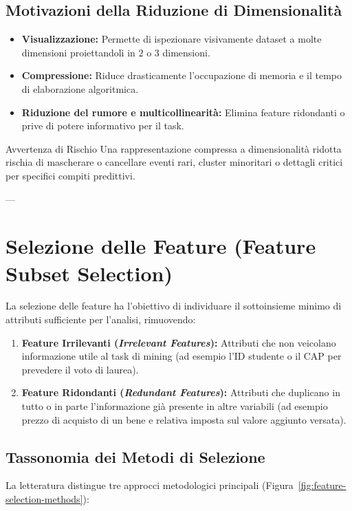 \subsection{Motivazioni della Riduzione di Dimensionalità}
\begin{itemize}
    \item \textbf{Visualizzazione:} Permette di ispezionare visivamente dataset a molte dimensioni proiettandoli in $2$ o $3$ dimensioni.
    \item \textbf{Compressione:} Riduce drasticamente l'occupazione di memoria e il tempo di elaborazione algoritmica.
    \item \textbf{Riduzione del rumore e multicollinearità:} Elimina feature ridondanti o prive di potere informativo per il task.
\end{itemize}

\begin{alertblock}{Avvertenza di Rischio}
Una rappresentazione compressa a dimensionalità ridotta rischia di mascherare o cancellare eventi rari, cluster minoritari o dettagli critici per specifici compiti predittivi.
\end{alertblock}

---

\section{Selezione delle Feature (Feature Subset Selection)}

La selezione delle feature ha l'obiettivo di individuare il sottoinsieme minimo di attributi sufficiente per l'analisi, rimuovendo:
\begin{enumerate}
    \item \textbf{Feature Irrilevanti (\textit{Irrelevant Features}):} Attributi che non veicolano informazione utile al task di mining (ad esempio l'ID studente o il CAP per prevedere il voto di laurea).
    \item \textbf{Feature Ridondanti (\textit{Redundant Features}):} Attributi che duplicano in tutto o in parte l'informazione già presente in altre variabili (ad esempio prezzo di acquisto di un bene e relativa imposta sul valore aggiunto versata).
\end{enumerate}

\subsection{Tassonomia dei Metodi di Selezione}
La letteratura distingue tre approcci metodologici principali (Figura~\ref{fig:feature-selection-methods}):

